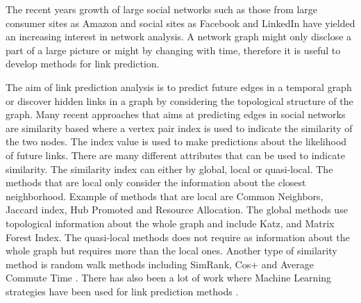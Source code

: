 The recent years growth of large social networks such as those from large consumer sites as Amazon and social sites as Facebook and LinkedIn have yielded an increasing interest in network analysis. A network graph might only disclose a part of a large picture or might by changing with time, therefore it is useful to develop methods for link prediction.

The aim of link prediction analysis is to predict future edges in a temporal graph or discover hidden links in a graph by considering the topological structure of the graph. Many recent approaches that aims at predicting edges in social networks are similarity based where a vertex pair index is used to indicate the similarity of the two nodes. The index value is used to make predictions about the likelihood of future links. There are many different attributes that can be used to indicate similarity. The similarity index can either by global, local or quasi-local. The methods that are local only consider the information about the closest neighborhood. Example of methods that are local are Common Neighbors, Jaccard index, Hub Promoted and Resource Allocation\cite{linkpredict}. The global methods use topological information about the whole graph and include Katz, and Matrix Forest Index\cite{linkpredict}. The quasi-local methods does not require as information about the whole graph but requires more than the local ones. Another type of similarity method is random walk methods including SimRank, Cos+ and Average Commute Time \cite{linkpredict}. There has also been a lot of work where Machine Learning strategies have been used for link prediction methods \cite{mlpredict1,mlpredict2,mlpredict3,mlpredict4,mlpredict5,mlpredict6,mlpredict7}.
